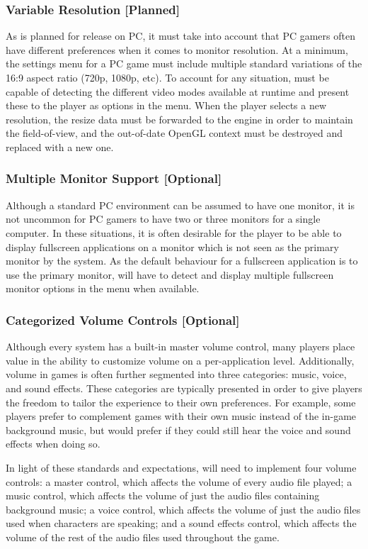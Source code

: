 \documentclass{GlobalDocument}
\begin{document}
\subsubsection{Variable Resolution [Planned]}
As \ourgame{} is planned for release on PC, it must take into account that PC gamers often have different preferences when it comes to monitor resolution. At a minimum, the settings menu for a PC game must include multiple standard variations of the 16:9 aspect ratio (720p, 1080p, etc). To account for any situation, \ourgame{} must be capable of detecting the different video modes available at runtime and present these to the player as options in the menu. When the player selects a new resolution, the resize data must be forwarded to the engine in order to maintain the field-of-view, and the out-of-date OpenGL context must be destroyed and replaced with a new one.

\subsubsection{Multiple Monitor Support [Optional]}
Although a standard PC environment can be assumed to have one monitor, it is not uncommon for PC gamers to have two or three monitors for a single computer. In these situations, it is often desirable for the player to be able to display fullscreen applications on a monitor which is not seen as the primary monitor by the system. As the default behaviour for a fullscreen application is to use the primary monitor, \ourgame{} will have to detect and display multiple fullscreen monitor options in the menu when available.

\subsubsection{Categorized Volume Controls [Optional]}
Although every system has a built-in master volume control, many players place value in the ability to customize volume on a per-application level. Additionally, volume in games is often further segmented into three categories: music, voice, and sound effects. These categories are typically presented in order to give players the freedom to tailor the experience to their own preferences. For example, some players prefer to complement games with their own music instead of the in-game background music, but would prefer if they could still hear the voice and sound effects when doing so.

In light of these standards and expectations, \ourgame{} will need to implement four volume controls: a master control, which affects the volume of every audio file played; a music control, which affects the volume of just the audio files containing background music; a voice control, which affects the volume of just the audio files used when characters are speaking; and a sound effects control, which affects the volume of the rest of the audio files used throughout the game. 
\end{document}
